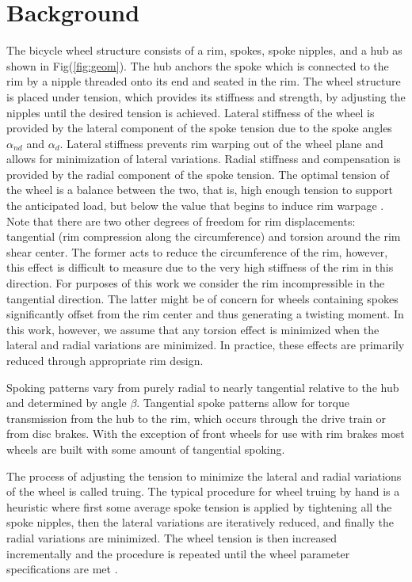 \documentclass[journal]{IEEEtran}
\begin{document}
\section{Background}
The bicycle wheel structure consists of a rim, spokes, spoke nipples, and a hub as shown in Fig(\ref{fig:geom}).  The hub anchors the spoke which is connected to the rim by a nipple threaded onto its end and seated in the rim. The wheel structure is placed under tension, which provides its stiffness and strength, by adjusting the nipples until the desired tension is achieved. Lateral stiffness of the wheel is provided by the lateral component of the spoke tension due to the spoke angles $\alpha_{nd}$ and $\alpha_d$. Lateral stiffness prevents rim warping out of the wheel plane and allows for minimization of lateral variations. Radial stiffness and compensation is provided by the radial component of the spoke tension. The optimal tension of the wheel is a balance between the two, that is, high enough tension to support the anticipated load, but below the value that begins to induce rim warpage \cite{FordThesis}. Note that there are two other degrees of freedom for rim displacements:  tangential (rim compression along the circumference) and torsion around the rim shear center.  The former acts to reduce the circumference of the rim, however, this effect is difficult to measure due to the very high stiffness of the rim in this direction.  For purposes of this work we consider the rim incompressible in the tangential direction. The latter might be of concern for wheels containing spokes significantly offset from the rim center and thus generating a twisting moment.  In this work, however, we assume that any torsion effect is minimized when the lateral and radial variations are minimized. In practice, these effects are primarily reduced through appropriate rim design.

Spoking patterns vary from purely radial to nearly tangential relative to the hub and determined by angle $\beta$.  Tangential spoke patterns allow for torque transmission from the hub to the rim, which occurs through the drive train or from disc brakes.  With the exception of front wheels for use with rim brakes most wheels are built with some amount of tangential spoking. 

The process of adjusting the tension to minimize the lateral and radial variations of the wheel is called truing. The typical procedure for wheel truing by hand is a heuristic where first some average spoke tension is applied by tightening all the spoke nipples, then the lateral variations are iteratively reduced, and finally the radial variations are minimized. The wheel tension is then increased incrementally and the procedure is repeated until the wheel parameter specifications are met \cite{Brandt}.
\end{document}
